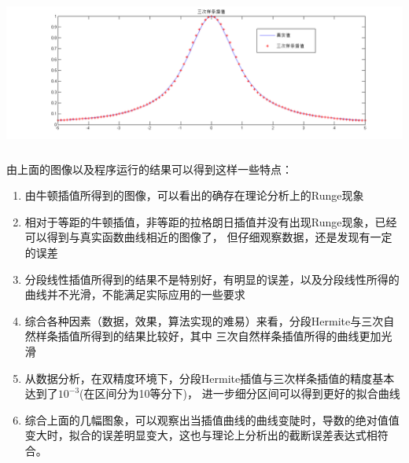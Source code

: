 \documentclass[10pt,a4paper]{ctexart}
\begin{document}
\centerline{\includegraphics[height=5cm,width=18cm]{三次样条.png}}
\par
由上面的图像以及程序运行的结果可以得到这样一些特点：
\begin{enumerate}
\item 由牛顿插值所得到的图像，可以看出的确存在理论分析上的Runge现象
\item
相对于等距的牛顿插值，非等距的拉格朗日插值并没有出现Runge现象，已经可以得到与真实函数曲线相近的图像了，
但仔细观察数据，还是发现有一定的误差
\item 
分段线性插值所得到的结果不是特别好，有明显的误差，以及分段线性所得的曲线并不光滑，不能满足实际应用的一些要求
\item 
综合各种因素（数据，效果，算法实现的难易）来看，分段Hermite与三次自然样条插值所得到的结果比较好，其中
三次自然样条插值所得的曲线更加光滑
\item
从数据分析，在双精度环境下，分段Hermite插值与三次样条插值的精度基本达到了$10^{-3}$(在区间分为10等分下)，
进一步细分区间可以得到更好的拟合曲线
\item 
综合上面的几幅图象，可以观察出当插值曲线的曲线变陡时，导数的绝对值值变大时，拟合的误差明显变大，这也与理论上分析出的截断误差表达式相符合。
\end{enumerate}
\end{document}
